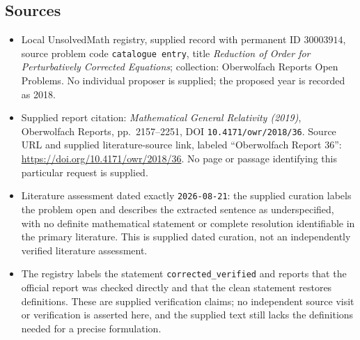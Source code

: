 \documentclass[11pt]{article}
\begin{document}
\subsection{Sources}
\begin{itemize}
\item Local UnsolvedMath registry, supplied record with permanent ID \(30003914\), source problem code \texttt{catalogue entry}, title \emph{Reduction of Order for Perturbatively Corrected Equations}; collection: Oberwolfach Reports Open Problems. No individual proposer is supplied; the proposed year is recorded as 2018.
\item Supplied report citation: \emph{Mathematical General Relativity (2019)}, Oberwolfach Reports, pp.\ 2157--2251, DOI \texttt{10.4171/owr/2018/36}. Source URL and supplied literature-source link, labeled ``Oberwolfach Report 36'': \url{https://doi.org/10.4171/owr/2018/36}. No page or passage identifying this particular request is supplied.
\item Literature assessment dated exactly \texttt{2026-08-21}: the supplied curation labels the problem open and describes the extracted sentence as underspecified, with no definite mathematical statement or complete resolution identifiable in the primary literature. This is supplied dated curation, not an independently verified literature assessment.
\item The registry labels the statement \texttt{corrected\_verified} and reports that the official report was checked directly and that the clean statement restores definitions. These are supplied verification claims; no independent source visit or verification is asserted here, and the supplied text still lacks the definitions needed for a precise formulation.
\end{itemize}
\end{document}
